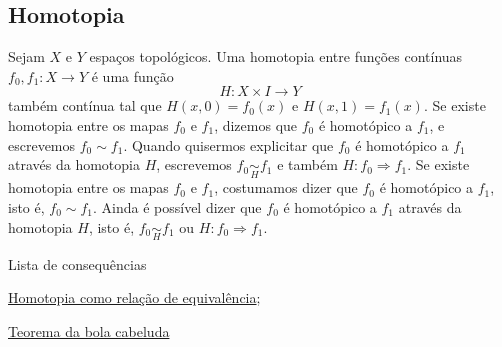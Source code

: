 \subsection{Homotopia}
\label{homotopia-def}
\begin{defi}[Homotopia]
	Sejam $X$ e $Y$ espaços topológicos. Uma homotopia entre funções contínuas $f_0, f_1: X\rightarrow Y$ é uma função $$H:X\times I\rightarrow Y$$ também contínua tal que $H(x,0)=f_0(x)$ e $H(x,1)=f_1(x)$. Se existe homotopia entre os mapas $f_0$ e $f_1$, dizemos que $f_0$ é homotópico a $f_1$, e escrevemos $f_0\sim f_1$. Quando quisermos explicitar que $f_0$ é homotópico a $f_1$ através da homotopia $H$, escrevemos $f_0 \underset{H}{\sim} f_1$ e também $H:f_0\Rightarrow f_1$. Se existe homotopia entre os mapas $f_0$ e $f_1$, costumamos dizer que $f_0$ é homotópico a $f_1$, isto é, $f_0\sim f_1$. Ainda é possível dizer que $f_0$ é homotópico a $f_1$ através da homotopia $H$, isto é, $f_0 \underset{H}{\sim} f_1$ ou $H:f_0\Rightarrow f_1$.
\end{defi}

\begin{titlemize}{Lista de consequências}
	\item \hyperref[homotopia-relaçao-de-equivalencia-prop]{Homotopia como relação de equivalência};\\ %
	\item \hyperref[homotopia-teorema-da-bola-cabeluda]{Teorema da bola cabeluda}
\end{titlemize}

